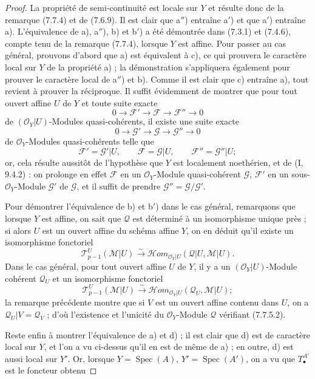 \begin{proof}
La propriété de semi-continuité est locale sur $Y$ et résulte donc de la
remarque (7.7.4) et de (7.6.9). Il est clair que a$''$) entraîne a$'$) et que
a$'$) entraîne a). L'équivalence de a), a$''$), b) et b$'$) a été démontrée
dans (7.3.1) et (7.4.6), compte tenu de la remarque (7.7.4), lorsque $Y$ est
affine. Pour passer au cas général, prouvons d'abord que a) est équivalent à c),
ce qui prouvera le caractère local sur $Y$ de la propriété a) ; la démonstration
s'appliquera également pour prouver le caractère local de a$''$) et b). Comme il
est clair que c) entraîne a), tout revient à prouver la réciproque. Il suffit
évidemment de montrer que pour tout ouvert affine $U$ de $Y$ et toute suite
exacte
\[
  0\longrightarrow\mathscr F'
  \longrightarrow\mathscr F
  \longrightarrow\mathscr F''
  \longrightarrow0
\]
de $(\mathscr O_Y|U)$-Modules quasi-cohérents, il existe une suite exacte
\[
  0\longrightarrow\mathscr G'
  \longrightarrow\mathscr G
  \longrightarrow\mathscr G''
  \longrightarrow0
\]
de $\mathscr O_Y$-Modules quasi-cohérents telle que
\[
  \mathscr F'=\mathscr G'|U,
  \qquad
  \mathscr F=\mathscr G|U,
  \qquad
  \mathscr F''=\mathscr G''|U;
\]
or, cela résulte aussitôt de l'hypothèse que $Y$ est localement noethérien, et
de (I, 9.4.2) : on prolonge en effet $\mathscr F$ en un $\mathscr O_Y$-Module
quasi-cohérent $\mathscr G$, $\mathscr F'$ en un sous-$\mathscr O_Y$-Module
$\mathscr G'$ de $\mathscr G$, et il suffit de prendre
$\mathscr G''=\mathscr G/\mathscr G'$.

Pour démontrer l'équivalence de b) et b$'$) dans le cas général, remarquons que
lorsque $Y$ est affine, on sait que $\mathscr Q$ est déterminé à un isomorphisme
unique près ; si alors $U$ est un ouvert affine du schéma affine $Y$, on en
déduit qu'il existe un isomorphisme fonctoriel
\[
  \mathscr T_{p-1}^{U}(\mathscr M|U)
  \xrightarrow{\sim}
  \mathscr{H}\!om_{\mathscr O_Y|U}
    (\mathscr Q|U,\mathscr M|U).
\]
Dans le cas général, pour tout ouvert affine $U$ de $Y$, il y a un
$(\mathscr O_Y|U)$-Module cohérent $\mathscr Q_U$ et un isomorphisme fonctoriel
\[
  \mathscr T_{p-1}^{U}(\mathscr M|U)
  \xrightarrow{\sim}
  \mathscr{H}\!om_{\mathscr O_Y|U}
    (\mathscr Q_U,\mathscr M|U);
\]
la remarque précédente montre que si $V$ est un ouvert affine contenu dans $U$,
on a $\mathscr Q_U|V=\mathscr Q_V$ ; d'où l'existence et l'unicité du
$\mathscr O_Y$-Module $\mathscr Q$ vérifiant (7.7.5.2).

Reste enfin à montrer l'équivalence de a) et d) ; il est clair que d) est de
caractère local sur $Y$, et l'on a vu ci-dessus qu'il en est de même de a) ; en
outre, d) est aussi local sur $Y'$. Or, lorsque $Y=\operatorname{Spec}(A)$,
$Y'=\operatorname{Spec}(A')$, on a vu que $T_\bullet^{A'}$ est le foncteur obtenu


\end{proof}
